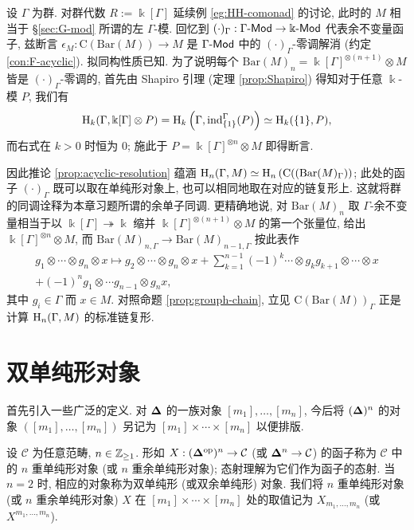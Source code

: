 \begin{example}[杠解消和群的同调]\label{eg:group-H-comonad}
	设 $\Gamma$ 为群. 对群代数 $R := \Bbbk[\Gamma]$ 延续例 \ref{eg:HH-comonad} 的讨论, 此时的 $M$ 相当于 \S\ref{sec:G-mod} 所谓的左 $\Gamma$-模. 回忆到 $(\cdot)_{\Gamma}: \Gamma\text{-}\mathsf{Mod} \to \Bbbk\text{-}\mathsf{Mod}$ 代表余不变量函子, 兹断言 $\epsilon_M: \mathrm{C}(\mathrm{Bar}(M)) \to M$ 是 $\Gamma\text{-}\mathsf{Mod}$ 中的 $(\cdot)_{\Gamma}$-零调解消 (约定 \ref{con:F-acyclic}). 拟同构性质已知. 为了说明每个 $\mathrm{Bar}(M)_n = \Bbbk[\Gamma]^{\otimes (n+1)} \otimes M$ 皆是 $(\cdot)_{\Gamma}$-零调的, 首先由 Shapiro 引理 (定理 \ref{prop:Shapiro}) 得知对于任意 $\Bbbk$-模 $P$, 我们有
	\[ \operatorname{H}_k(\Gamma, \Bbbk[\Gamma] \otimes P ) = \operatorname{H}_k\left( \Gamma, \operatorname{ind}^{\Gamma}_{\{1\}}(P) \right) \simeq \operatorname{H}_k(\{1\}, P), \]
	而右式在 $k > 0$ 时恒为 $0$; 施此于 $P = \Bbbk[\Gamma]^{\otimes n} \otimes M$ 即得断言.
	
	因此推论 \ref{prop:acyclic-resolution} 蕴涵 $\operatorname{H}_n(\Gamma, M) \simeq \operatorname{H}_n \left( \mathrm{C}((\mathrm{Bar}(M)_{\Gamma}) \right)$; 此处的函子 $(\cdot)_{\Gamma}$ 既可以取在单纯形对象上, 也可以相同地取在对应的链复形上. 这就将群的同调诠释为本章习题所谓的余单子同调. 更精确地说, 对 $\mathrm{Bar}(M)_n$ 取 $\Gamma$-余不变量相当于以 $\Bbbk[\Gamma] \twoheadrightarrow \Bbbk$ 缩并 $\Bbbk[\Gamma]^{\otimes (n+1)} \otimes M$ 的第一个张量位, 给出 $\Bbbk[\Gamma]^{\otimes n} \otimes M$, 而 $\mathrm{Bar}(M)_{n, \Gamma} \to \mathrm{Bar}(M)_{n-1, \Gamma}$ 按此表作
	\begin{multline*}
		g_1 \otimes \cdots \otimes g_n \otimes x \mapsto g_2 \otimes \cdots \otimes g_n \otimes x + \sum_{k=1}^{n-1} (-1)^k \cdots \otimes g_k g_{k+1} \otimes \cdots \otimes x \\
		+ (-1)^n g_1 \otimes \cdots g_{n-1} \otimes g_n x,
	\end{multline*}
	其中 $g_i \in \Gamma$ 而 $x \in M$. 对照命题 \ref{prop:grouph-chain}, 立见 $\mathrm{C}(\mathrm{Bar}(M))_{\Gamma}$ 正是计算 $\operatorname{H}_n(\Gamma, M)$ 的标准链复形.
\end{example}

\section{双单纯形对象}\label{sec:bisimplicial}
首先引入一些广泛的定义. 对 $\bm\Delta$ 的一族对象 $[m_1], \ldots, [m_n]$, 今后将 $(\bm\Delta)^n$ 的对象 $([m_1], \ldots, [m_n])$ 另记为 $[m_1] \times \cdots \times [m_n]$ 以便排版.

\begin{definition}
	设 $\mathcal{C}$ 为任意范畴, $n \in \mathbb{Z}_{\geq 1}$. 形如 $X: (\bm\Delta^{\operatorname{op}})^n \to \mathcal{C}$ (或 $\bm\Delta^n \to \mathcal{C}$) 的函子称为 $\mathcal{C}$ 中的 $n$ 重单纯形对象 (或 $n$ 重余单纯形对象); 态射理解为它们作为函子的态射. 当 $n=2$ 时, 相应的对象称为双单纯形 (或双余单纯形) 对象. 我们将 $n$ 重单纯形对象 (或 $n$ 重余单纯形对象) $X$ 在 $[m_1] \times \cdots \times [m_n]$ 处的取值记为 $X_{m_1, \ldots, m_n}$ (或 $X^{m_1, \ldots, m_n}$).
\end{definition}

